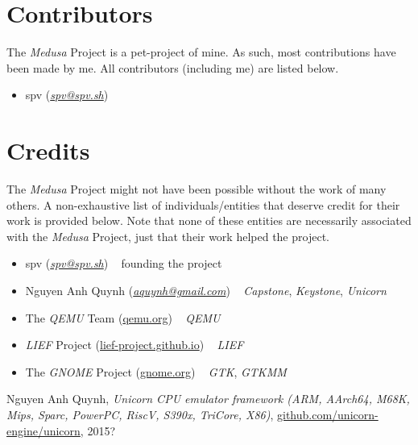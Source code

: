 \documentclass{report}
\newcommand{\Medusa}{\textit{Medusa}\xspace}
\begin{document}
	\chapter{Contributors}
	The \Medusa Project is a pet-project of mine. As such, most
	contributions have been made by me. All contributors (including me) are
	listed below.

	\begin{itemize}
		\item spv (\textit{\href{mailto:spv@spv.sh}{spv@spv.sh}})
	\end{itemize}

	\chapter{Credits}
	The \Medusa Project might not have been possible without the work of many
	others. A non-exhaustive list of individuals/entities that deserve credit
	for their work is provided below. Note that none of these entities are
	necessarily associated with the \Medusa Project, just that their work helped
	the project.

	\begin{itemize}
		\item spv (\textit{\href{mailto:spv@spv.sh}{spv@spv.sh}}) ~ founding the
		project

		\item Nguyen Anh Quynh
		(\textit{\href{mailto:aquynh@gmail.com}{aquynh@gmail.com}}) ~
		\textit{Capstone}, \textit{Keystone}, \textit{Unicorn}

		\item The \textit{QEMU} Team (\href{https://www.qemu.org}{qemu.org}) ~
		\textit{QEMU}

		\item \textit{LIEF} Project
		(\href{https://lief-project.github.io/}{lief-project.github.io}) ~
		\textit{LIEF}

		\item The \textit{GNOME} Project
		(\href{https://www.gnome.org}{gnome.org}) ~ \textit{GTK}, \textit{GTKMM}
	\end{itemize}

	\begin{thebibliography}{99}
			Nguyen Anh Quynh,
			\textit{Unicorn CPU emulator framework (ARM, AArch64, M68K, Mips,
			Sparc, PowerPC, RiscV, S390x, TriCore, X86)},
			\href{https://github.com/unicorn-engine/unicorn}
				 {github.com/unicorn-engine/unicorn},
			2015?
	\end{thebibliography}
\end{document}
